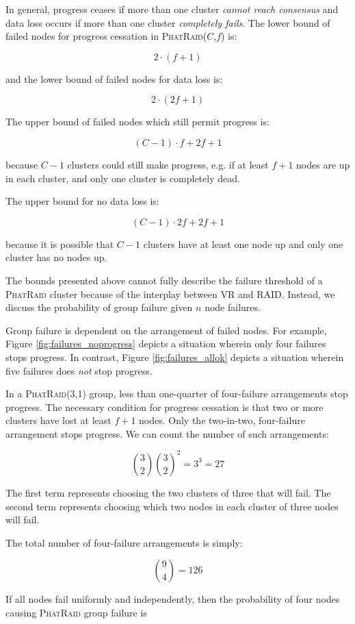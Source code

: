 \documentclass[10pt,letter]{article}
\newcommand{\phatraid}[0]{\textsc{PhatRaid}}
\newcommand{\phatraidcf}[2]{\textsc{PhatRaid}(#1,#2)}
\begin{document}
In general, progress ceases if more than one cluster \emph{cannot reach
  consensus} and data loss occurs if more than one cluster \emph{completely
  fails}. The lower bound of failed nodes for progress cessation in
\phatraidcf{$C$}{$f$} is:

    $$ 2\cdot(f+1) $$

and the lower bound of failed nodes for data loss is:

    $$ 2\cdot(2f+1) $$

The upper bound of failed nodes which still
permit progress is:

    $$ (C-1)\cdot f + 2f + 1 $$

because $C-1$ clusters could still make progress, e.g. if at least $f+1$ nodes are up in
each cluster, and only one cluster is completely dead.

The upper bound for no data loss is:

    $$ (C-1)\cdot 2f + 2f + 1 $$

because it is possible that $C-1$ clusters have at least one node up
and only one cluster has no nodes up.

The bounds presented above cannot fully describe the failure threshold of a
\phatraid{} cluster because of the interplay between VR and RAID. Instead, we
discuss the probability of group failure given $n$ node failures.

Group failure is dependent on the arrangement of failed nodes. For example,
Figure \ref{fig:failures_noprogress} depicts a situation wherein only four
failures stops progress. In contrast, Figure \ref{fig:failures_allok} depicts a
situation wherein five failures does \emph{not} stop progress.

In a \phatraidcf{3}{1} group, less than one-quarter of four-failure arrangements
stop progress. The necessary condition for progress cessation is that two or
more clusters have lost at least $f+1$ nodes.
Only the two-in-two, four-failure arrangement stops progress. We can count the
number of such arrangements:

    $$ \binom{3}{2} \binom{3}{2}^2 = 3^3 = 27 $$

The first term represents choosing the two clusters of three that will
fail. The second term represents choosing which two nodes in each cluster of
three nodes will fail.

The total number of four-failure arrangements is simply:

    $$ \binom{9}{4} = 126 $$

If all nodes fail uniformly and independently, then the probability of four
nodes causing \phatraid{} group failure is
\end{document}
